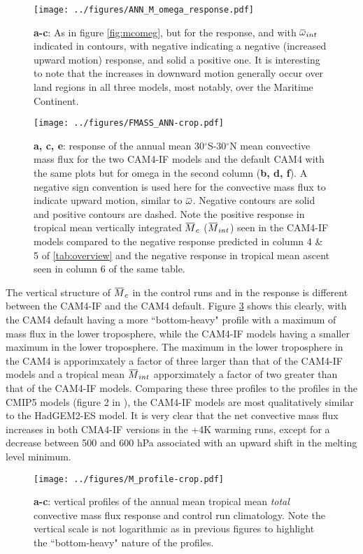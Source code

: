 \documentclass[letterpaper,12pt,titlepage,oneside,final]{book}
\newcommand{\overbar}[1]{\mkern 1.5mu\overline{\mkern-1.5mu#1\mkern-1.5mu}\mkern 1.5mu}
\begin{document}
\begin{figure}[H]
\centering
\noindent\texttt{[image: ../figures/ANN\_M\_omega\_response.pdf]}\hfill
\caption{\textbf{a-c}: As in figure \ref{fig:mcomeg}, but for the response, and with $\overbar{\omega}_{int}$ indicated in contours, with negative indicating a negative (increased upward motion) response, and solid a positive one. It is interesting to note that the increases in downward motion generally occur over land regions in all three models, most notably, over the Maritime Continent.}
\label{fig:mcomegres}
\end{figure}
\begin{figure}[H]
\centering
\noindent\texttt{[image: ../figures/FMASS\_ANN-crop.pdf]}\hfill
\caption{\textbf{a, c, e}: response of the annual mean 30$^\circ$S-30$^\circ$N mean convective mass flux for the two CAM4-IF models and the default CAM4 with the same plots but for omega in the second column (\textbf{b, d, f}). A negative sign convention is used here for the convective mass flux to indicate upward motion, similar to $\overbar{\omega}$. Negative contours are solid and positive contours are dashed. Note the positive response in tropical mean vertically integrated $\overbar{M}_{c}$ ($\overbar{M}_{int}$) seen in the CAM4-IF models compared to the negative response predicted in column 4 \& 5 of \ref{tab:overview} and the negative response in tropical mean ascent seen in column 6 of the same table. }
\label{fig:Mc}
\end{figure}
The vertical structure of $\overbar{M}_{c}$ in the control runs and in the response is different between the CAM4-IF and the CAM4 default. Figure \ref{fig:mprofs} shows this clearly, with the CAM4 default having a more ``bottom-heavy" profile with a maximum of mass flux in the lower troposphere, while the CAM4-IF models having a smaller maximum in the lower troposphere. The maximum in the lower troposphere in the CAM4 is apporimxately a factor of three larger than that of the CAM4-IF models and a tropical mean $\overbar{M}_{int}$ apporximately a factor of two greater than that of the CAM4-IF models. Comparing these three profiles to the profiles in the CMIP5 models (figure 2 in \cite{chadwick_spatial_2012}), the CAM4-IF models are most qualitatively similar to the HadGEM2-ES model. It is very clear that the net convective mass flux increases in both CMA4-IF versions in the +4K warming runs, except for a decrease between 500 and 600 hPa associated with an upward shift in the melting level minimum.
\begin{figure}[H]
\centering
\noindent\texttt{[image: ../figures/M\_profile-crop.pdf]}\hfill
\caption{\textbf{a-c}: vertical profiles of the annual mean tropical mean \textit{total} convective mass flux response and control run climatology. Note the vertical scale is not logarithmic as in previous figures to highlight the ``bottom-heavy" nature of the profiles.}
\label{fig:mprofs}
\end{figure}
\end{document}

